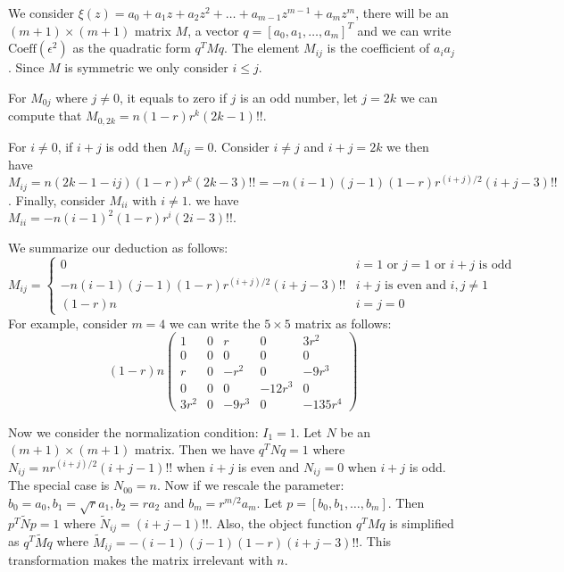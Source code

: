 \documentclass{article}
\begin{document}
We consider $\xi(z) = a_0 + a_1 z + a_2 z^2 + \dots + a_{m-1} z^{m-1} + a_m z^m $, there will be an $(m+1) \times (m+1) $ matrix $M$, a vector  $q = [a_0, a_1, \dots, a_m]^T$ and  we can write $\textrm{Coeff}(\epsilon^2)$ as the quadratic form $ q^T M q $. The element $M_{ij}$ is the coefficient of $a_ia_j$. Since $M$ is symmetric we only consider $i\leq j$.

For $M_{0j}$ where $j \neq 0$, it equals to zero if $j$ is an odd number, let $j=2k$ we can compute that $M_{0,2k}=n (1-r)r^k (2k-1)!! $. 

For $i \neq 0$, if $i+j$ is odd then $M_{ij} = 0$. Consider $i \neq j$ and $i+j = 2k$ we then have $M_{ij} = n(2k-1-ij) (1-r)r^k (2k-3)!! = -n(i-1)(j-1) (1-r)r^{(i+j)/ 2 } (i+j-3)!!$. Finally, consider $M_{ii}$ with $i \neq 1$. we have $M_{ii} = 
-n(i-1)^2 (1-r)r^i (2i-3)!!$.

We summarize our deduction as follows:
\begin{equation}
M_{ij} = \begin{cases} 0 & i=1 \textrm{ or } j=1 \textrm{ or } i + j \textrm{ is odd} \\
 -n(i-1)(j-1) (1-r)r^{(i+j)/ 2 } (i+j-3)!! & i+j \textrm{ is even and } i,j \neq 1 \\
(1-r)n & i=j=0
\end{cases}
\end{equation}
For example, consider $m = 4$ we can write the $ 5 \times 5 $ matrix as follows:
$$
(1-r)n\begin{pmatrix}
1 & 0 & r  & 0 & 3r^2\\
0 & 0 & 0  & 0 & 0\\
r &  0 & - r^2 & 0 & -9 r^3 \\
0 & 0 & 0 & -12r^3 & 0 \\
3r^2 & 0 & -9 r^3 & 0 & -135r^4 
\end{pmatrix}
$$

Now we consider the normalization condition: $I_1 = 1$. Let $N$ be an $(m+1) \times (m+1)$ matrix.
Then we have $q^T N q = 1$ where $N_{ij} =nr^{(i+j) / 2} (i+j -1)!!$ when $i+j$ is even and $N_{ij} = 0$ when $i+j$ is odd. The special case is $N_{00} = n$. Now if we rescale the parameter: $b_0 =  a_0, b_1 = \sqrt{r} a_1, b_2 = r a_2$ and $b_m = r^{m/2} a_m$. Let $p = [b_0, b_1, \dots, b_m]$. Then $p^T \widetilde{N} p =1$ where $\widetilde{N}_{ij} =  (i+j -1)!!$. Also, the object function $q^T M q$ is simplified as $q^T \widetilde{M} q$ where $\widetilde{M}_{ij} =  -(i-1)(j-1)(1-r) (i+j-3)!! $. This transformation makes the matrix irrelevant with $n$.
\end{document}
